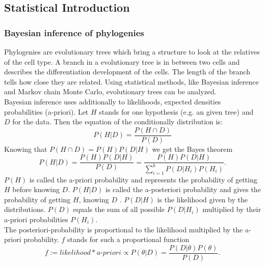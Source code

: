 \documentclass[12pt]{article} %
\begin{document}
	\subsection{Statistical Introduction}
	\subsubsection{Bayesian inference of phylogenies}
	Phylogenies are evolutionary trees which bring a structure to look at the relatives of the cell type. A branch in a evolutionary tree is in between two cells and describes the differentiation development of the cells. The length of the branch tells how close they are related. Using statistical methods, like  Bayesian inference and Markov chain Monte Carlo, evolutionary trees can be analyzed.\\
	
	Bayesian inference uses additionally to likelihoods, expected densities probabilities (a-priori). 
	Let $H$ stands for one hypothesis (e.g. an given tree) and $D$ for the data. Then the equation of the conditionally distribution is: 
	\begin{equation*}
		P(H|D)=\frac{P(H \cap D)}{P(D)}
	\end{equation*}
	Knowing that $P(H \cap D) = P(H)P(D|H)$ we get the Bayes theorem 
	\begin{equation}
		P(H|D)=\frac{P(H)P(D|H)}{P(D)}=\frac{P(H)P(D|H)}{\sum_{i=1}^{k}P(D|H_i)P(H_i)}.
		\label{equ:bayes_theorem}
	\end{equation}
	$P(H)$ is called the a-priori probability and represents the probability of getting $H$ before knowing $D$. $P(H|D)$ is called the a-posteriori probability and gives the probability of getting $H$, knowing $D$ \citep{fahrmeir2007}. $P(D|H)$ is the likelihood given by the distributions. $P(D)$ equals the sum of all possible $P(D|H_i)$ multiplied by their a-priori probabilities $P(H_i)$.\\
	
	The posteriori-probability is proportional to the likelihood multiplied by the a-priori probability. $f$ stands for such a proportional function
	\begin{equation*}
		f := likelihood * a\text{-}priori \propto P(\theta|D) = \frac{P(D|\theta)P(\theta)}{P(D)}.
	\end{equation*}
	
	
	
	
	
	
	
	
	
\end{document}
